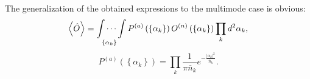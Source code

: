 The generalization of the obtained expressions to the multimode case is obvious: 
\begin{equation}
\left<\hat{O}\right> = \idotsint\limits_{\left\{\alpha_k\right\}}
P^{(a)}
\left(
\left\{\alpha_k\right\}
\right)
O^{(n)}
\left(
\left\{\alpha_k\right\}
\right)
\prod_k d^2 \alpha_k,
\label{eqCh1_113}
\end{equation}
\[
P^{(a)}
\left(
\left\{\alpha_k\right\}
\right)
=
\prod_k \frac{1}{\pi \bar{n}_k}
e^{-\frac{\left|\alpha_k\right|^2}{\bar{n}_k}}. 
\]